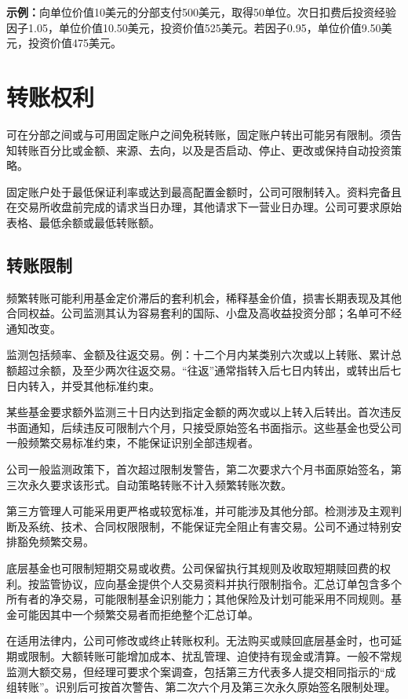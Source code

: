 \documentclass[UTF8,fontset=none,11pt,a4paper]{ctexart}
\begin{document}
\textbf{示例：}向单位价值10美元的分部支付500美元，取得50单位。次日扣费后投资经验因子1.05，单位价值10.50美元，投资价值525美元。若因子0.95，单位价值9.50美元，投资价值475美元。


\section*{转账权利}
可在分部之间或与可用固定账户之间免税转账，固定账户转出可能另有限制。须告知转账百分比或金额、来源、去向，以及是否启动、停止、更改或保持自动\allowbreak\mbox{投资策略。}


固定账户处于最低保证利率或达到最高配置金额时，公司可限制转入。资料完备且在交易所收盘前完成的请求当日办理，其他请求下一营业日办理。公司可要求原始表格、最低余额或最\allowbreak\mbox{低转账额。}


\subsection*{转账限制}
频繁转账可能利用基金定价滞后的套利机会，稀释基金价值，损害长期表现及其他合同权益。公司监测其认为容易套利的国际、小盘及高收益投资分部；名单可不经\allowbreak\mbox{通知改变。}


监测包括频率、金额及往返交易。例：十二个月内某类别六次或以上转账、累计总额超过余额，及至少两次往返交易。“往返”通常指转入后七日内转出，或转出后七日内转入，并受其他\allowbreak\mbox{标准约束。}


某些基金要求额外监测三十日内达到指定金额的两次或以上转入后转出。首次违反书面通知，后续违反可限制六个月，只接受原始签名书面指示。这些基金也受公司一般频繁交易标准约束，不能保证识别全\allowbreak\mbox{部违规者。}


公司一般监测政策下，首次超过限制发警告，第二次要求六个月书面原始签名，第三次永久要求该形式。自动策略转账不计入频繁\allowbreak\mbox{转账次数。}


第三方管理人可能采用更严格或较宽标准，并可能涉及其他分部。检测涉及主观判断及系统、技术、合同权限限制，不能保证完全阻止有害交易。公司不通过特别安排豁免\allowbreak\mbox{频繁交易。}


底层基金也可限制短期交易或收费。公司保留执行其规则及收取短期赎回费的权利。按监管协议，应向基金提供个人交易资料并执行限制指令。汇总订单包含多个所有者的净交易，可能限制基金识别能力；其他保险及计划可能采用不同规则。基金可能因其中一个频繁交易者而拒绝整个\allowbreak\mbox{汇总订单。}


在适用法律内，公司可修改或终止转账权利。无法购买或赎回底层基金时，也可延期或限制。大额转账可能增加成本、扰乱管理、迫使持有现金或清算。一般不常规监测大额交易，但经理可要求个案调查，包括第三方代表多人提交相同指示的“成组转账”。识别后可按首次警告、第二次六个月及第三次永久原始签名\allowbreak\mbox{限制处理。}
\end{document}
